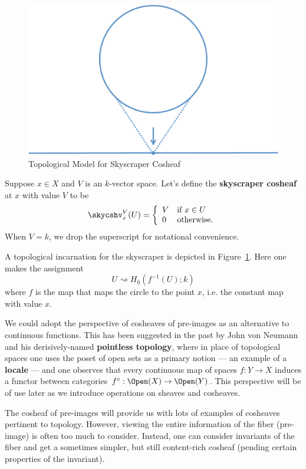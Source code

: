 \begin{figure}[ht]
\centering
\includegraphics[width=.6\textwidth]{presheaf_2.pdf}
\caption{Topological Model for Skyscraper Cosheaf}
\label{fig:skyscraper}
\end{figure}

\begin{defn}
	Suppose $x\in X$ and $V$ is an $k$-vector space. Let's define the \textbf{skyscraper cosheaf} at $x$ with value $V$ to be
	\[
		\skycshv_x^V(U)=\left\{ \begin{array}{ll} V & \textrm{if $x\in U$}\\
		0 & \textrm{otherwise.}\end{array} \right.
	\]
	When $V=k$, we drop the superscript for notational convenience.

	A topological incarnation for the skyscraper is depicted in Figure~\ref{fig:skyscraper}. Here one makes the assignment
	\[
	U \rightsquigarrow H_0(f^{-1}(U);k)
	\]
	where $f$ is the map that maps the circle to the point $x$, i.e. the constant map with value $x$.
\end{defn}

We could adopt the perspective of cosheaves of pre-images as an alternative to continuous functions. This has been suggested in the past by John von Neumann and his derisively-named \textbf{pointless topology}, where in place of topological spaces one uses the poset of open sets as a primary notion --- an example of a \textbf{locale} --- and one observes that every continuous map of spaces $f:Y\to X$ induces a functor between categories $f^{\circ}:\Open(X)\to\Open(Y)$. This perspective will be of use later as we introduce operations on sheaves and cosheaves.

The cosheaf of pre-images will provide us with lots of examples of cosheaves pertinent to topology. However, viewing the entire information of the fiber (pre-image) is often too much to consider. Instead, one can consider invariants of the fiber and get a sometimes simpler, but still content-rich cosheaf (pending certain properties of the invariant).

